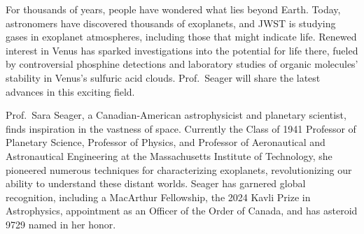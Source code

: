 \documentclass[a4paper,parskip,10pt]{scrartcl}
\begin{document}
    \begin{tcolorbox}[
        enhanced,
        title={Public Outreach Event: Sara Seager (MIT) \\ An Enduring Mystery of Astronomy: Can We Find Signs of Life Beyond Earth?},
        sharp corners,
        colbacktitle=thistrack,
        fonttitle=\large\mediumfont,
        boxsep=0pt,
        boxrule=0pt,
        left*=0pt,
        lefttitle=4mm,
        toptitle=4mm,
        bottomtitle=4mm,
        top=0pt,
        bottom=0pt,
        sidebyside,
        sidebyside align=center,
        lefthand width=6cm,
        segmentation empty,
    ]%
        
        \tcblower

        \setlength{\parskip}{1ex}
        
        \vspace{1ex}
        For thousands of years, people have wondered what lies beyond Earth. Today, astronomers have discovered thousands of exoplanets, and JWST is studying gases in exoplanet atmospheres, including those that might indicate life. Renewed interest in Venus has sparked investigations into the potential for life there, fueled by controversial phosphine detections and laboratory studies of organic molecules' stability in Venus's sulfuric acid clouds. Prof.~Seager will share the latest advances in this exciting field.

        {
            \small
            \color{white!20!black}
            Prof.~Sara Seager, a Canadian-American astrophysicist and planetary scientist, finds inspiration in the vastness of space. Currently the Class of 1941 Professor of Planetary Science, Professor of Physics, and Professor of Aeronautical and Astronautical Engineering at the Massachusetts Institute of Technology, she pioneered numerous techniques for characterizing exoplanets, revolutionizing our ability to understand these distant worlds. Seager has garnered global recognition, including a MacArthur Fellowship, the 2024 Kavli Prize in Astrophysics, appointment as an Officer of the Order of Canada, and has asteroid 9729 named in her honor.}


\end{tcolorbox}
\end{document}
